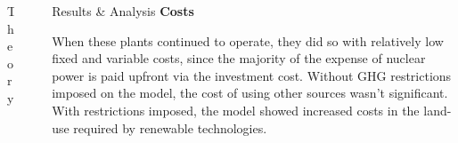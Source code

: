 \documentclass[final]{beamer}
\newlength{\sepwid}
\newlength{\onecolwid}
\newlength{\threecolwid}
\begin{document}
\begin{frame}[t]
\begin{columns}[t,totalwidth=\threecolwid]
\begin{column}{\onecolwid}
\begin{block}{Theory}
\end{block}



\end{column} %

\begin{column}{\sepwid}\end{column} %



\begin{column}{\onecolwid} %

\begin{block}{Results \& Analysis}
\vspace{0.7em}
\textbf{Costs}



When these plants continued to operate, they did so with relatively low fixed and variable costs, since the majority of the expense of nuclear power is paid upfront via the investment cost. Without GHG restrictions imposed on the model, the cost of using other sources wasn’t significant. With restrictions imposed, the model showed increased costs in the land-use required by renewable technologies.



\end{block}
\end{column}
\end{columns}
\end{frame}
\end{document}
